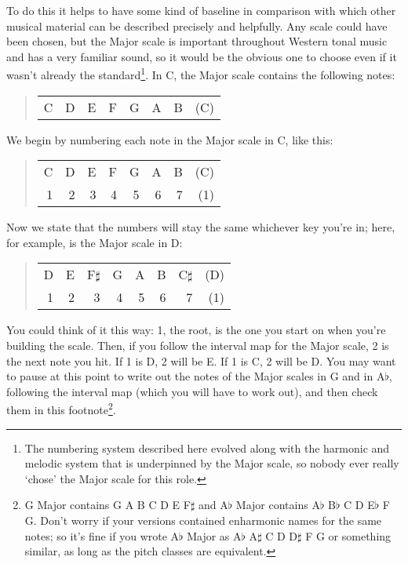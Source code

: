 \documentclass[english]{./gbook}
\begin{document}
\begin{large}
To do this it helps to have some kind of baseline in comparison with which other musical material can be described precisely and helpfully. Any scale could have been chosen, but the Major scale is important throughout Western tonal music and has a very familiar sound, so it would be the obvious one to choose even if it wasn't already the standard\footnote{The numbering system described here evolved along with the harmonic and melodic system that is underpinned by the Major scale, so nobody ever really `chose' the Major scale for this role.}. In C, the Major scale contains the following notes:
\begin{quote}
\begin{tabular}{rrrrrrrr}
C	&D	&E	&F	&G	&A	&B	&(C)
\end{tabular}
\end{quote}
We begin by numbering each note in the Major scale in C, like this:
\begin{quote}
\begin{tabular}{rrrrrrrr}
C	&D	&E	&F	&G	&A	&B	&(C)\\
1	&2	&3	&4	&5	&6	&7	&(1)
\end{tabular}
\end{quote}
Now we state that the numbers will stay the same whichever key you're in; here, for example, is the Major scale in D:
\begin{quote}
\begin{tabular}{rrrrrrrr}
D	&E	&F$\sharp$	&G	&A	&B	&C$\sharp$	&(D) \\
1	&2	&3	&4	&5	&6	&7	&(1)
\end{tabular}
\end{quote}
You could think of it this way: 1, the root, is the one you start on when you're building the scale. Then, if you follow the interval map for the Major scale, 2 is the next note you hit. If 1 is D, 2 will be E. If 1 is C, 2 will be D. You may want to pause at this point to write out the notes of the Major scales in G and in A$\flat$, following the interval map (which you will have to work out), and then check them in this footnote\footnote{G Major contains G A B C D E F$\sharp$ and A$\flat$ Major contains A$\flat$ B$\flat$ C D E$\flat$ F G. Don't worry if your versions contained enharmonic names for the same notes; so it's fine if you wrote A$\flat$ Major as A$\flat$ A$\sharp$ C D D$\sharp$ F G or something similar, as long as the pitch classes are equivalent.}.


\end{large}
\end{document}
